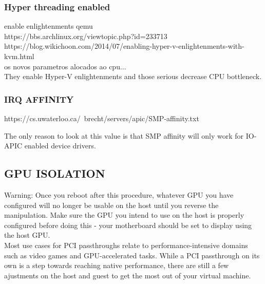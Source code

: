 \documentclass[11pt, a4paper, oneside]{article}
\theoremstyle{definition}
\begin{document}
\subsubsection{Hyper threading enabled}
enable enlightenments qemu\\
https://bbs.archlinux.org/viewtopic.php?id=233713\\
https://blog.wikichoon.com/2014/07/enabling-hyper-v-enlightenments-with-kvm.html\\

os novos parametros alocados ao cpu...\\
They enable Hyper-V enlightenments and those serious decrease CPU bottleneck.

\subsubsection{IRQ AFFINITY}
https://cs.uwaterloo.ca/~brecht/servers/apic/SMP-affinity.txt

The only reason to look at this value is that 
SMP affinity will only work for IO-APIC enabled device drivers.


\vfill
\pagebreak
\subsection{GPU ISOLATION}
Warning: Once you reboot after this procedure, whatever GPU you have configured will no longer be usable on the host until you reverse the manipulation. Make sure the GPU you intend to use on the host is properly configured before doing this - your motherboard should be set to display using the host GPU.\\

Most use cases for PCI passthroughs relate to performance-intensive domains such as video games and GPU-accelerated tasks. While a PCI passthrough on its own is a step towards reaching native performance, there are still a few ajustments on the host and guest to get the most out of your virtual machine. \\
\end{document}
